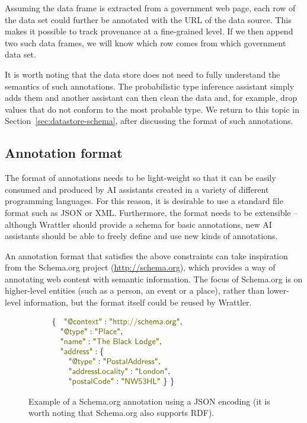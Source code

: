 \documentclass[sigplan,preprint,10pt]{acmart}\settopmatter{printfolios=true,printccs=false,printacmref=false}
\newcommand{\str}[1]{\textnormal{\textcolor{strclr}{\sffamily "#1"}}}
\begin{document}
{\noindent
Assuming the data frame is extracted from a government web page, each row of the data set
could further be annotated with the URL of the data source. This makes it possible to track
provenance at a fine-grained level. If we then append two such data frames, we will know
which row comes from which government data set.

It is worth noting that the data store does not need to fully understand the semantics of such 
annotations. The probabilistic type inference assistant simply adds them and another assistant
can then clean the data and, for example, drop values that do not conform to the most 
probable type. We return to this topic in Section~\ref{sec:datastore-schema}, after discussing
the format of such annotations.

\subsection{Annotation format}
The format of annotations needs to be light-weight so that it can be easily consumed and produced
by AI assistants created in a variety of different programming languages. For this reason, it is
desirable to use a standard file format such as JSON or XML. Furthermore, the format needs to 
be extensible -- although Wrattler should provide a schema for basic annotations, new AI assistants
should be able to freely define and use new kinds of annotations.

An annotation format that satisfies the above constraints can take inspiration from the 
Schema.org project (\url{http://schema.org}), which provides a way of annotating web content
with semantic information. The focus of Schema.org is on higher-level entities (such as 
a person, an event or a place), rather than lower-level information, but the format itself could
be reused by Wrattler.

\begin{figure}
\begin{equation*}
\begin{array}{l}
\{~~\; \str{@context}: \str{http://schema.org},\\
\quad  \str{@type}: \str{Place},\\
\quad  \str{name}: \str{The Black Lodge},\\
\quad  \str{address}: \{\\
\qquad    \str{@type}: \str{PostalAddress},\\
\qquad    \str{addressLocality}: \str{London},\qquad\qquad\qquad\qquad\qquad~\\
\qquad    \str{postalCode}: \str{NW53HL} ~\}~\}\\
\end{array}
\end{equation*}
\caption{\small{Example of a Schema.org annotation using a JSON encoding (it is worth noting 
that Schema.org also supports RDF).}}
\label{fig:schema}
\vspace{-1em}
\end{figure}

}
\end{document}
